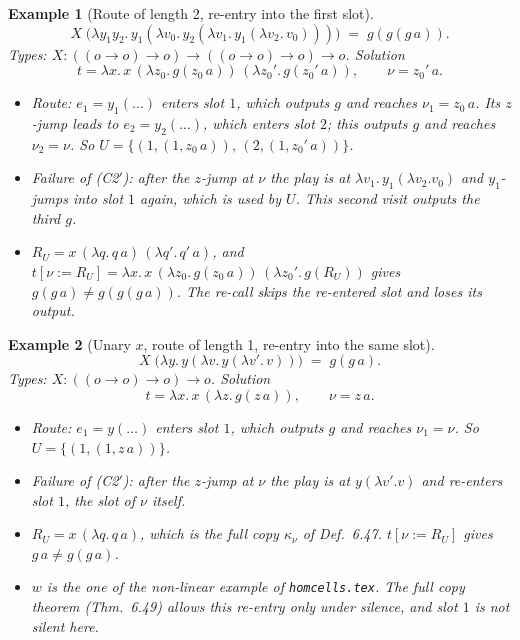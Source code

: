 \documentclass[11pt]{article}
\newtheorem{example}{Example}
\begin{document}
\begin{example}[Route of length 2, re-entry into the first slot]\label{ex:c2a}
\[
X\;\bigl(\lambda y_1y_2.\,y_1(\lambda v_0.\,y_2(\lambda v_1.\,y_1(\lambda v_2.\,v_0)))\bigr)\;=\;g(g(g\,a)).
\]
Types: $X:((o\to o)\to o)\to((o\to o)\to o)\to o$.  Solution
\[
t=\lambda x.\,x\,(\lambda z_0.\,g(z_0\,a))\,(\lambda z_0'.\,g(z_0'\,a)),
\qquad \nu=z_0'\,a .
\]
\begin{itemize}
\item Route: $e_1=y_1(\dots)$ enters slot $1$, which outputs $g$ and
  reaches $\nu_1=z_0\,a$.  Its $z$-jump leads to $e_2=y_2(\dots)$, which
  enters slot $2$; this outputs $g$ and reaches $\nu_2=\nu$.  So
  $U=\{(1,(1,z_0\,a)),\,(2,(1,z_0'\,a))\}$.
\item Failure of (C2$'$): after the $z$-jump at $\nu$ the play is at
  $\lambda v_1.\,y_1(\lambda v_2.v_0)$ and $y_1$-jumps into slot $1$ again,
  which is used by $U$.  This second visit outputs the third $g$.
\item $R_U=x\,(\lambda q.\,q\,a)\,(\lambda q'.\,q'\,a)$, and
  $t[\nu:=R_U]=\lambda x.\,x\,(\lambda z_0.\,g(z_0\,a))\,(\lambda z_0'.\,g(R_U))$
  gives $g(g\,a)\neq g(g(g\,a))$.  The re-call skips the re-entered slot
  and loses its output.
\end{itemize}
\end{example}

\begin{example}[Unary $x$, route of length 1, re-entry into the same slot]\label{ex:c2b}
\[
X\;\bigl(\lambda y.\,y(\lambda v.\,y(\lambda v'.\,v))\bigr)\;=\;g(g\,a).
\]
Types: $X:((o\to o)\to o)\to o$.  Solution
\[
t=\lambda x.\,x\,(\lambda z.\,g(z\,a)),\qquad \nu=z\,a .
\]
\begin{itemize}
\item Route: $e_1=y(\dots)$ enters slot $1$, which outputs $g$ and reaches
  $\nu_1=\nu$.  So $U=\{(1,(1,z\,a))\}$.
\item Failure of (C2$'$): after the $z$-jump at $\nu$ the play is at
  $y(\lambda v'.v)$ and re-enters slot $1$, the slot of $\nu$ itself.
\item $R_U=x\,(\lambda q.\,q\,a)$, which is the full copy $\kappa_\nu$ of
  Def.~6.47.  $t[\nu:=R_U]$ gives $g\,a\neq g(g\,a)$.
\item $w$ is the one of the non-linear example of \texttt{homcells.tex}.  The full
  copy theorem (Thm.~6.49) allows this re-entry only under silence, and
  slot $1$ is not silent here.
\end{itemize}
\end{example}
\end{document}
